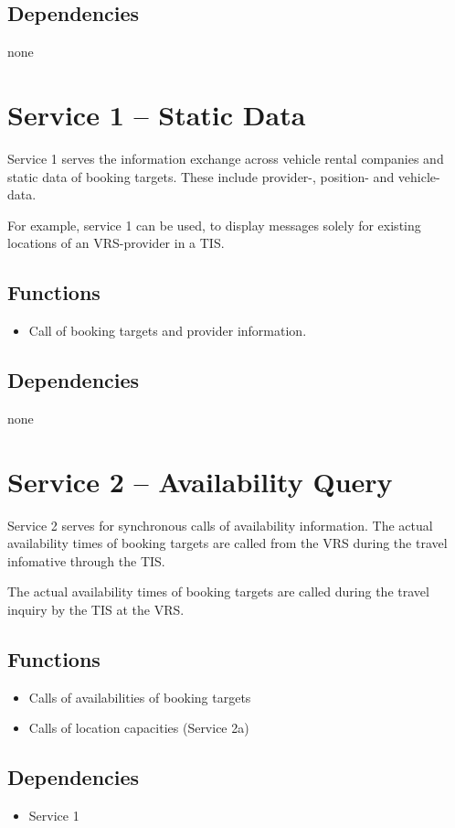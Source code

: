 \subsection*{Dependencies}
none


\section{Service 1 -- Static Data}
\label{sec:Hierachiemodell:Dienst1}
Service 1 serves the information exchange across vehicle rental companies and static data of booking targets. These include provider-, position- and vehicle-data.

For example, service 1 can be used, to display messages solely for existing locations of an VRS-provider in a TIS. 
\subsection*{Functions}
\begin{itemize}
\item Call of booking targets and provider information.
\end{itemize}

\subsection*{Dependencies}
none

\section{Service 2 -- Availability Query}
\label{sec:Hierachiemodell:Dienst2}
Service 2 serves for synchronous calls of availability information. The actual availability times of booking targets are called from the VRS during the travel infomative through the TIS.

The actual availability times of booking targets are called during the travel inquiry by the TIS at the VRS.
\subsection*{Functions}
\begin{itemize}
\item Calls of availabilities of booking targets
\item Calls of location capacities (Service 2a)
\end{itemize}

\subsection*{Dependencies}
\begin{itemize}
\item Service 1
\end{itemize}

